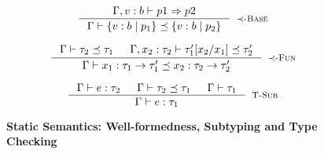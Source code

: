 \begin{figure}[ht!]
\medskip {}

$$
\inference
   {\Gamma, v:b \vdash  p1 \Rightarrow p2 }
   {\isSubType{\Gamma}{\tref{b}{p_1}}{\tref{b}{p_2}}}
   [\tsubBase]
$$

$$
\inference
   {\isSubType{\Gamma}{\tau_2}{\tau_1} &
	\isSubType{\Gamma, x_2:{\tau_2}}{\SUBST{\tau_1'}{x_1}{x_2}}{\tau_2'}	
   }
   {\isSubType{\Gamma}
	  {\tfun{x_1}{\tau_1}{\tau_1'}}
	  {\tfun{x_2}{\tau_2}{\tau_2'}}
}[\tsubFun]
$$


\medskip {}

$$\begin{array}{cc}

\inference
  {  \hastype{\Gamma}{e}{\tau_2} && \isSubType{\Gamma}{\tau_2}{\tau_1} 
  && \isWellFormed{\Gamma}{\tau_1}
  }
  {\hastype{\Gamma}{e}{\tau_1}}
  [\tsub]
\end{array}$$

\caption{\textbf{Static Semantics: Well-formedness, Subtyping and Type Checking}}
\label{fig:rules}
\end{figure}